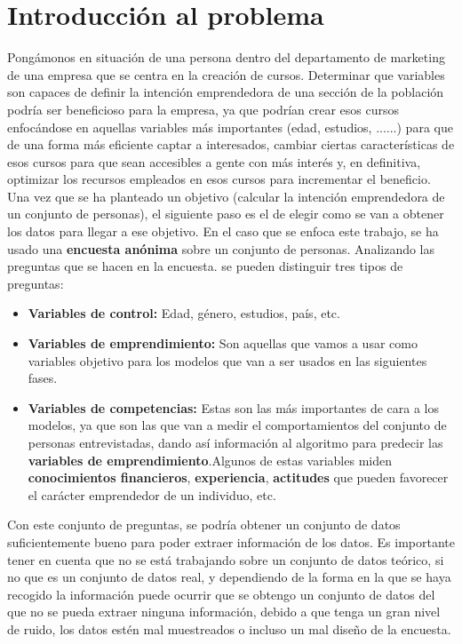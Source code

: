 \chapter{Introducción al problema}
\label{sec:problema}
Pongámonos en situación de una persona dentro del departamento de marketing de una empresa que se centra en la creación de cursos. Determinar que variables son capaces de definir la intención emprendedora de una sección de la población podría ser beneficioso para la empresa, ya que podrían crear esos cursos enfocándose en aquellas variables más importantes (edad, estudios, ......) para que de una forma más eficiente captar a interesados, cambiar ciertas características de esos cursos para que sean accesibles a gente con más interés y, en definitiva, optimizar los recursos empleados en esos cursos para incrementar el beneficio.\\
\linebreak
Una vez que se ha planteado un objetivo (calcular la intención emprendedora de un conjunto de personas), el siguiente paso es el de elegir como se van a obtener los datos para llegar a ese objetivo. En el caso que se enfoca este trabajo, se ha usado una \textbf{encuesta anónima} sobre un conjunto de personas.
Analizando las preguntas que se hacen en la encuesta. se pueden distinguir tres tipos de preguntas:
\begin{itemize}
	\item \textbf{Variables de control:} Edad, género, estudios, país, etc.
	\item \textbf{Variables de emprendimiento:} Son aquellas que vamos a usar como variables objetivo para los modelos que van a ser usados en las siguientes fases.
	\item\textbf{Variables de competencias:} Estas son las más importantes de cara a los modelos, ya que son las que van a medir el comportamientos del conjunto de personas entrevistadas, dando así información al algoritmo para predecir las \textbf{variables de emprendimiento}.Algunos de estas variables miden \textbf{conocimientos financieros}, \textbf{experiencia}, \textbf{actitudes} que pueden favorecer el carácter emprendedor de un individuo, etc.
\end{itemize}
Con este conjunto de preguntas, se podría obtener un conjunto de datos suficientemente bueno para poder extraer información de los datos. Es importante tener en cuenta que no se está trabajando sobre un conjunto de datos teórico, si no que es un conjunto de datos real, y dependiendo de la forma en la que se haya recogido la información puede ocurrir que se obtengo un conjunto de datos del que no se pueda extraer ninguna información, debido a que tenga un gran nivel de ruido, los datos estén mal muestreados o incluso un mal diseño de la encuesta.\\
